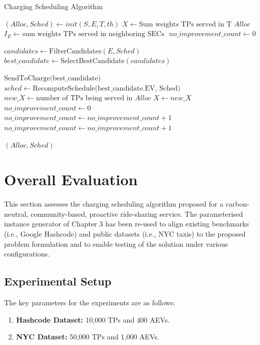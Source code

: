 


\begin{algorithm}
\caption{Charging Scheduling Algorithm}
\begin{algorithmic}

    \State $(Alloc, Sched) \gets init(S, E, T, th)$
    \State $X \gets \text{Sum  weights  TPs served in T } Alloc$
    \State $I_E \gets \text{sum  weights TPs served in neighboring SECs }$
    \State $no\_improvement\_count \gets 0$



        \State $candidates \gets \text{FilterCandidates}(E, Sched)$
        \State $best\_candidate \gets \text{SelectBestCandidate}(candidates)$

            \State $\text{SendToCharge(best\_candidate)}$
            \State $sched \gets \text{RecomputeSchedule(best\_candidate.EV, Sched)}$
            \State $new\_X \gets \text{number of TPs being served in } Alloc$
                \State $X \gets new\_X$
                \State $no\_improvement\_count \gets 0$
            \Else
                \State $no\_improvement\_count \gets no\_improvement\_count + 1$
            \EndIf
        \Else
            \State $no\_improvement\_count \gets no\_improvement\_count + 1$
        \EndIf
    \EndWhile

    \Return $(Alloc, Sched)$
\EndFunction
\end{algorithmic}
\end{algorithm}

\section{Overall Evaluation}
\label{sec:evaluation}

This section assesses the charging scheduling algorithm proposed for a carbon-neutral, community-based, proactive ride-sharing service. The parameterised instance generator of Chapter 3 has been re-used to align existing benchmarks (i.e., Google Hashcode) and public datasets (i.e., NYC taxis) to the proposed problem formulation and to enable testing of the solution under various configurations.

\subsection{Experimental Setup}
The key parameters for the experiments are as follows:
\begin{enumerate}
    \item \textbf{Hashcode Dataset:} 10,000 TPs and 400 AEVs.
    \item \textbf{NYC Dataset:} 50,000 TPs and 1,000 AEVs.
\end{enumerate}

